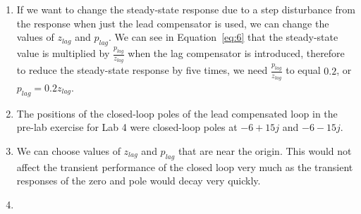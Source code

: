 \documentclass[12pt]{article}
\begin{document}
\begin{enumerate}
	\item %
	If we want to change the steady-state response due to a step disturbance from the response when just the lead compensator is used, we can change the values of $z_{lag}$ and $p_{lag}$. We can see in Equation~\ref{eq:6} that the steady-state value is multiplied by $\frac{p_{lag}}{z_{lag}}$ when the lag compensator is introduced, therefore to reduce the steady-state response by five times, we need $\frac{p_{lag}}{z_{lag}}$ to equal $0.2$, or $p_{lag} = 0.2 z_{lag}$.

	\item %
	The positions of the closed-loop poles of the lead compensated loop in the pre-lab exercise for Lab 4 were closed-loop poles at $-6 + 15j$ and $-6 - 15j$.
	
	\item %
	We can choose values of $z_{lag}$ and $p_{lag}$ that are near the origin. This would not affect the transient performance of the closed loop very much as the transient responses of the zero and pole would decay very quickly. 
	
	\item %
	
\end{enumerate}
\end{document}
